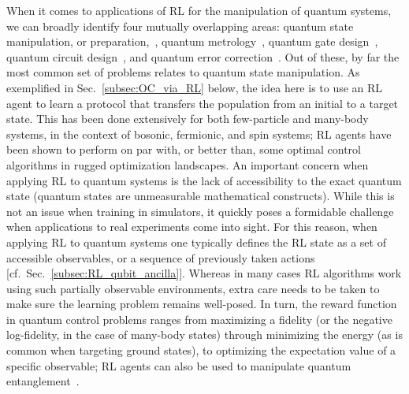 When it comes to applications of RL for the manipulation of quantum systems, we can broadly identify four mutually overlapping areas: quantum state manipulation, or preparation,~\cite{bukov2018reinforcement,yao2021reinforcement,sivak2022model-free,Porotti2022,metz2023self,reuer2023realizing, XiChenRL1, XiChenRL2, XiChenRL3}, quantum metrology~\cite{MarcoRL1}, quantum gate design~\cite{niu2019universal,dalgaard2020global,baum2021experimental,moro2021quantum,nguyen2023reinforcement}, quantum circuit design~\cite{foesel2021quantum,bolens2021reinforcement,he2021variational,herreramarti2022policy,patel2024curriculum}, and quantum error correction~\cite{foesel2018reinforcement, sweke2020reinforcement, andreasson2019quantum, fitzek2020deep,sivak2023real}. 
Out of these, by far the most common set of problems relates to quantum state manipulation. As exemplified in Sec.~\ref{subsec:OC_via_RL} below, the idea here is to use an RL agent to learn a protocol that transfers the population from an initial to a target state. This has been done extensively for both few-particle and many-body systems, in the context of bosonic, fermionic, and spin systems; RL agents have been shown to perform on par with, or better than, some optimal control algorithms in rugged optimization landscapes. An important concern when applying RL to quantum systems is the lack of accessibility to the exact quantum state (quantum states are unmeasurable mathematical constructs). While this is not an issue when training in simulators, it quickly poses a formidable challenge when applications to real experiments come into sight. For this reason, when applying RL to quantum systems one typically defines the RL state as a set of accessible observables, or a sequence of previously taken actions [cf.~Sec.~\ref{subsec:RL_qubit_ancilla}]. Whereas in many cases RL algorithms work using such partially observable environments, extra care needs to be taken to make sure the learning problem remains well-posed. In turn, the reward function in quantum control problems ranges from maximizing a fidelity (or the negative log-fidelity, in the case of many-body states) through minimizing the energy (as is common when targeting ground states), to optimizing the expectation value of a specific observable; RL agents can also be used to manipulate quantum entanglement~\cite{tashev2024reinforcement}. 


